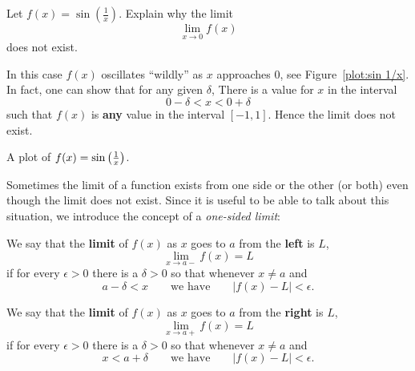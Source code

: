 \begin{example}
Let  $f(x) = \sin\left(\frac{1}{x}\right)$. Explain why the limit
\[
\lim_{x\to 0} f(x)
\]
does not exist.
\end{example}
\begin{solution}
In this case $f(x)$ oscillates ``wildly'' as $x$ approaches $0$, see
Figure~\ref{plot:sin 1/x}. In fact, one can show that for any given
  $\delta$, There is a value for $x$ in the interval
\[
0-\delta < x < 0+\delta
\]
such that $f(x)$ is \textbf{any} value in the interval $[-1,1]$. Hence
the limit does not exist.
\end{solution}
\begin{marginfigure}[-1in]
\caption{A plot of $f(x)=\protect\sin\left(\frac{1}{x}\right)$.}
\label{plot:sin 1/x}
\end{marginfigure}

Sometimes the limit of a function exists from one side or the other
(or both) even though the limit does not exist. Since it is useful to
be able to talk about this situation, we introduce the concept of a
\textit{one-sided limit}:

\begin{definition} We say that the \textbf{limit} of $f(x)$ as $x$ goes to $a$ from the \textbf{left} is $L$,
\[
\lim_{x\to a-}f(x)=L
\]
if for every $\epsilon>0$ there is a $\delta > 0$ so that whenever $x\ne a$ and 
\[
a-\delta < x \qquad\text{we have}\qquad |f(x)-L|<\epsilon.
\]

We say that the \textbf{limit} of $f(x)$ as $x$ goes to $a$ from the \textbf{right} is $L$,
\[
\lim_{x\to a+}f(x)=L
\] 
if for every $\epsilon>0$ there is a $\delta > 0$ so that whenever $x \ne a$ and 
\[
x<a+\delta \qquad\text{we have}\qquad |f(x)-L|<\epsilon.
\]
\end{definition}


